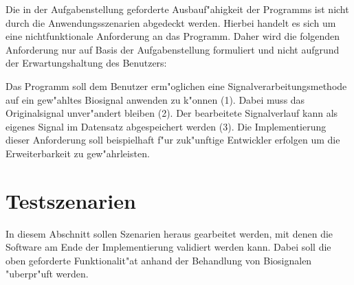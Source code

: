 Die in der Aufgabenstellung geforderte Ausbauf"ahigkeit der Programms ist nicht durch die Anwendungsszenarien abgedeckt werden.
Hierbei handelt es sich um eine nichtfunktionale Anforderung an das Programm.
Daher wird die folgenden Anforderung nur auf Basis der Aufgabenstellung formuliert und nicht aufgrund der Erwartungshaltung des Benutzers:
\begin{enumerate}[resume]
	 Das Programm soll dem Benutzer erm"oglichen eine Signalverarbeitungsmethode auf ein gew"ahltes Biosignal anwenden zu k"onnen (1).
							Dabei muss das Originalsignal unver"andert bleiben (2).
							Der bearbeitete Signalverlauf kann als eigenes Signal im Datensatz abgespeichert werden (3).
							Die Implementierung dieser Anforderung soll beispielhaft f"ur zuk"unftige Entwickler erfolgen um die Erweiterbarkeit zu gew"ahrleisten.
\end{enumerate}

\section{Testszenarien}
\label{chap:testszenarien}

In diesem Abschnitt sollen Szenarien heraus gearbeitet werden, mit denen die Software am Ende der Implementierung validiert werden kann.
Dabei soll die oben geforderte Funktionalit"at anhand der Behandlung von Biosignalen "uberpr"uft werden.


